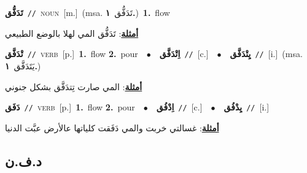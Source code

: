 \documentclass[10pt,a4paper,twoside]{article} %
\begin{document}
\begin{multicols}{2}
{\setlength\topsep{0pt}\textbf{\foreignlanguage{arabic}{تَدَفُّق}}\ {\color{gray}\texttt{//}\color{black}}\ \textsc{noun}\ [m.]\ \color{gray}(msa. \foreignlanguage{arabic}{تَدَفُّق}~\foreignlanguage{arabic}{\textbf{١.}})\color{black}\ \textbf{1.}~flow\  \begin{flushright}\color{gray}\foreignlanguage{arabic}{\textbf{\underline{\foreignlanguage{arabic}{أمثلة}}}: تَدَفُّق المي لهلا بالوضع الطبيعي}\end{flushright}\color{black}} \vspace{2mm}

{\setlength\topsep{0pt}\textbf{\foreignlanguage{arabic}{تْدَفَّق}}\ {\color{gray}\texttt{//}\color{black}}\ \textsc{verb}\ [p.]\ \textbf{1.}~flow  \textbf{2.}~pour\ \ $\bullet$\ \ \setlength\topsep{0pt}\textbf{\foreignlanguage{arabic}{اِتْدَفَّق}}\ {\color{gray}\texttt{//}\color{black}}\ [c.]\ \ $\bullet$\ \ \setlength\topsep{0pt}\textbf{\foreignlanguage{arabic}{يِتْدَفَّق}}\ {\color{gray}\texttt{//}\color{black}}\ [i.]\ \color{gray}(msa. \foreignlanguage{arabic}{يَتَدَفَّق}~\foreignlanguage{arabic}{\textbf{١.}})\color{black}\  \begin{flushright}\color{gray}\foreignlanguage{arabic}{\textbf{\underline{\foreignlanguage{arabic}{أمثلة}}}: المي صارت تِتدَفَّق بشكل جنوني}\end{flushright}\color{black}} \vspace{2mm}

{\setlength\topsep{0pt}\textbf{\foreignlanguage{arabic}{دَفَق}}\ {\color{gray}\texttt{//}\color{black}}\ \textsc{verb}\ [p.]\ \textbf{1.}~flow  \textbf{2.}~pour\ \ $\bullet$\ \ \setlength\topsep{0pt}\textbf{\foreignlanguage{arabic}{اِدْفُق}}\ {\color{gray}\texttt{//}\color{black}}\ [c.]\ \ $\bullet$\ \ \setlength\topsep{0pt}\textbf{\foreignlanguage{arabic}{يِدْفُق}}\ {\color{gray}\texttt{//}\color{black}}\ [i.]\  \begin{flushright}\color{gray}\foreignlanguage{arabic}{\textbf{\underline{\foreignlanguage{arabic}{أمثلة}}}: غسالتي خربت والمي دَفَقت كلياتها عالأرض عبَّت الدنيا}\end{flushright}\color{black}} \vspace{2mm}

\vspace{-3mm}
\subsection*{\color{blue}\foreignlanguage{arabic}{د.ف.ن}\color{blue}{}} 


\end{multicols}
\end{document}
